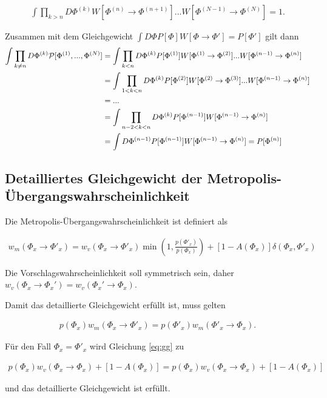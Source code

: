 \documentclass[10pt,a4paper]{article}
\begin{document}
 \begin{align*}
	\int \prod_{k > n} D\Phi^{(k)} W[\Phi^{(n)}\to \Phi^{(n+1)}]...W[\Phi^{(N-1)}\to \Phi^{(N)}]=1.
 \end{align*}

Zusammen mit dem Gleichgewicht $\int D\Phi P[\Phi] W[\Phi\to \Phi'] = P[\Phi']$ gilt dann
 \begin{align*}
      \int \prod_{k\neq n} D\Phi^{(k)} {\cal P}[\Phi^{(1)},...,\Phi^{(N)}] &= \int \prod_{k <  n} D\Phi^{(k)}P[\Phi^{(1)}] W[\Phi^{(1)}\to \Phi^{(2)}]...W[\Phi^{(n-1)}\to \Phi^{(n)}] \\
&=\int \prod_{1 < k <  n} D\Phi^{(k)}P[\Phi^{(2)}] W[\Phi^{(2)}\to \Phi^{(3)}]...W[\Phi^{(n-1)}\to \Phi^{(n)}]\\
&= ...\\
&=\int \prod_{n-2 < k <  n} D\Phi^{(k)}P[\Phi^{(n-1)}] W[\Phi^{(n-1)}\to \Phi^{(n)}] \\
&=\int  D\Phi^{(n-1)}P[\Phi^{(n-1)}] W[\Phi^{(n-1)}\to \Phi^{(n)}] = P[\Phi^{(n)}]
 \end{align*}

\subsection{Detailliertes Gleichgewicht der Metropolis-Übergangswahrscheinlichkeit}
Die Metropolis-Übergangswahrscheinlichkeit ist definiert als

\begin{align*}
	w_m(\Phi_x\to\Phi'_x) = w_v(\Phi_x\to\Phi'_x) \min \left(1,\frac{p(\Phi'_x)}{p(\Phi_x)}\right) + [1-A(\Phi_x)]\delta(\Phi_x,\Phi'_x)
\end{align*}

Die Vorschlagswahrscheinlichkeit soll symmetrisch sein, daher $w_v(\Phi_x\to\Phi_x')=w_v(\Phi_x'\to\Phi_x)$.

Damit das detaillierte Gleichgewicht erfüllt ist, muss gelten

\begin{align}\label{eq:gg}
p(\Phi_x) w_m(\Phi_x\to\Phi'_x)= p(\Phi'_x)w_m(\Phi'_x\to\Phi_x).
\end{align}

Für den Fall $\Phi_x = \Phi'_x$ wird Gleichung \ref{eq:gg} zu

\begin{align*}
	p(\Phi_x) w_v(\Phi_x\to\Phi_x) + [1-A(\Phi_x)] = p(\Phi_x) w_v(\Phi_x\to\Phi_x) + [1-A(\Phi_x)]
\end{align*}

und das detaillierte Gleichgewicht ist erfüllt.
\end{document}
